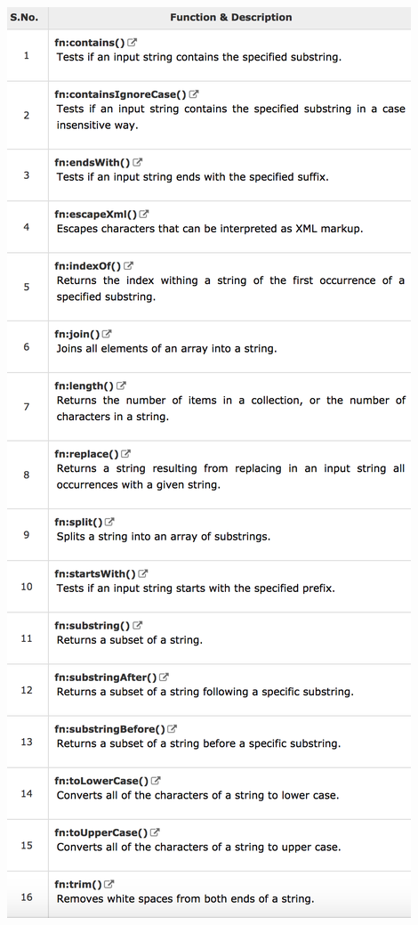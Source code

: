 \documentclass[11pt]{article}
\begin{document}
\begin{center}
	\includegraphics[width=0.7\linewidth]{JSTL_Functions}
\end{center}
			
			
\end{document}
